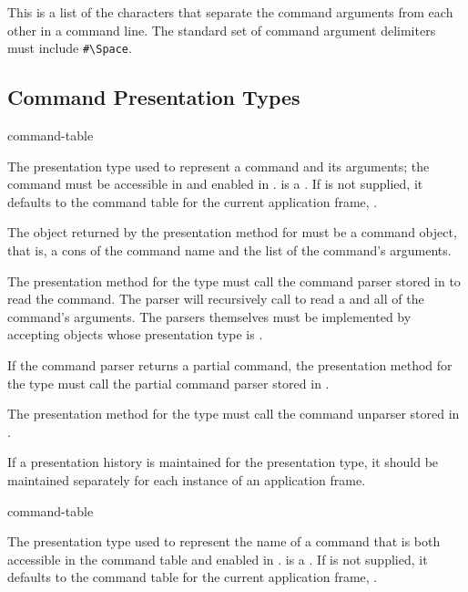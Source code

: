 
This is a list of the characters that separate the command arguments from each
other in a command line.  The standard set of command argument delimiters must
include \verb+#\Space+.


\subsection {Command Presentation Types}

 {\key command-table}

The presentation type used to represent a command and its arguments; the command
must be accessible in  and enabled in
.   is a .  If  is not supplied, it defaults to the command
table for the current application frame, .

The object returned by the  presentation method for 
must be a command object, that is, a cons of the command name and the list of
the command's arguments.

The  presentation method for the  type must call the
command parser stored in  to read the command.  The parser
will recursively call  to read a  and all of the
command's arguments.  The parsers themselves must be implemented by accepting
objects whose presentation type is .

If the command parser returns a partial command, the  presentation
method for the  type must call the partial command parser stored in
.

The  presentation method for the  type must call the
command unparser stored in .

If a presentation history is maintained for the  presentation type,
it should be maintained separately for each instance of an application frame.

 {\key command-table}

The presentation type used to represent the name of a command that is both
accessible in the command table  and enabled in
.   is a .  If  is not supplied, it defaults to the command
table for the current application frame, .

